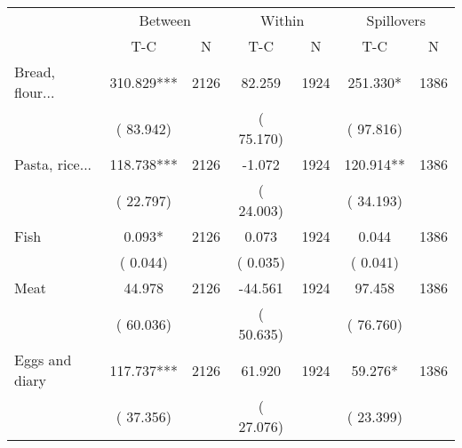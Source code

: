 
\begin{tabular}{l*{6}{c}}\hline&\multicolumn{2}{c}{Between}&\multicolumn{2}{c}{Within}&\multicolumn{2}{c}{Spillovers} \\ \cmidrule(r){2-3}\cmidrule(l){4-5}\cmidrule(l){6-7} & {T-C} & {N} & {T-C} & {N}  & {T-C}  & {N}  \\ \midrule
Bread, flour...        &            310.829***      &       2126       &             82.259      &       1924       &            251.330*      &       1386       \\
                       &       (      83.942)            &                               &       (      75.170)            &                               &       (      97.816)            &                               \\
Pasta, rice...        &            118.738***      &       2126       &             -1.072      &       1924       &            120.914**      &       1386       \\
                       &       (      22.797)            &                               &       (      24.003)            &                               &       (      34.193)            &                               \\
Fish        &              0.093*      &       2126       &              0.073      &       1924       &              0.044      &       1386       \\
                       &       (       0.044)            &                               &       (       0.035)            &                               &       (       0.041)            &                               \\
Meat        &             44.978      &       2126       &            -44.561      &       1924       &             97.458      &       1386       \\
                       &       (      60.036)            &                               &       (      50.635)            &                               &       (      76.760)            &                               \\
Eggs and diary        &            117.737***      &       2126       &             61.920      &       1924       &             59.276*      &       1386       \\
                       &       (      37.356)            &                               &       (      27.076)            &                               &       (      23.399)            &                               \\

\end{tabular}
